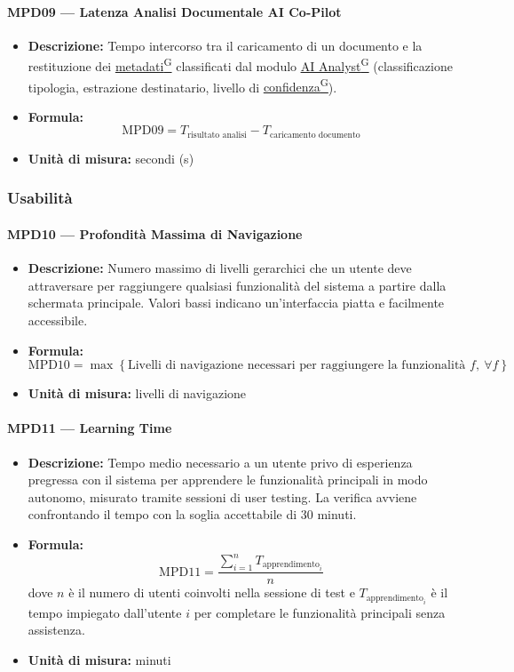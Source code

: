 \documentclass[a4paper,12pt]{article}
\providecommand{\glslink}[2]{\href{https://alittlebyte-19.github.io/Documentazione/glossario.html\#gls-#1}{\underline{#2}\textsuperscript{\scriptsize G}}}
\begin{document}
\paragraph{MPD09 --- Latenza Analisi Documentale AI Co-Pilot}
\begin{itemize}
    \item \textbf{Descrizione:} Tempo intercorso tra il caricamento di un documento e la restituzione dei \glslink{metadati}{metadati} classificati dal modulo \glslink{ai-analyst}{AI Analyst} (classificazione tipologia, estrazione destinatario, livello di \glslink{confidenza-confidence-score}{confidenza}).
    \item \textbf{Formula:}
    $$\text{MPD09} = T_{\text{risultato analisi}} - T_{\text{caricamento documento}}$$
    \item \textbf{Unità di misura:} secondi (s)
\end{itemize}

\subsubsection{Usabilità}

\paragraph{MPD10 --- Profondità Massima di Navigazione}
\begin{itemize}
    \item \textbf{Descrizione:} Numero massimo di livelli gerarchici che un utente deve attraversare per raggiungere qualsiasi funzionalità del sistema a partire dalla schermata principale. Valori bassi indicano un'interfaccia piatta e facilmente accessibile.
    \item \textbf{Formula:}
    $$\text{MPD10} = \max \left\{ \text{Livelli di navigazione necessari per raggiungere la funzionalità } f,\ \forall f \right\}$$
    \item \textbf{Unità di misura:} livelli di navigazione
\end{itemize}

\paragraph{MPD11 --- Learning Time}
\begin{itemize}
    \item \textbf{Descrizione:} Tempo medio necessario a un utente privo di esperienza pregressa con il sistema per apprendere le funzionalità principali in modo autonomo, misurato tramite sessioni di user testing. La verifica avviene confrontando il tempo con la soglia accettabile di 30 minuti.
    \item \textbf{Formula:}
    $$\text{MPD11} = \frac{\displaystyle\sum_{i=1}^{n} T_{\text{apprendimento}_i}}{n}$$
    dove $n$ è il numero di utenti coinvolti nella sessione di test e $T_{\text{apprendimento}_i}$ è il tempo impiegato dall'utente $i$ per completare le funzionalità principali senza assistenza.
    \item \textbf{Unità di misura:} minuti
\end{itemize}
\end{document}
